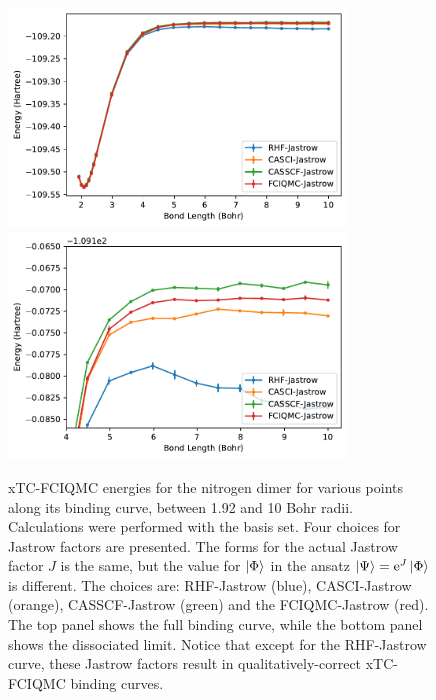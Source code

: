 \begin{figure}[htbp]
    \centering
    \includegraphics[width=0.8\textwidth]{figures/binding/all_binding_curves}
    \includegraphics[width=0.8\textwidth]{figures/binding/all_binding_curves_dissociated}
    \caption{xTC-FCIQMC energies for the nitrogen dimer for various points along its binding curve, between 1.92 and 10 Bohr radii. Calculations were performed with the \avtz basis set. Four choices for Jastrow factors are presented. The forms for the actual Jastrow factor $J$ is the same, but the value for $\ket{\Phi}$ in the ansatz $\ket\Psi=\mathrm{e}^J\ket\Phi$ is different. The choices are: RHF-Jastrow (blue), CASCI-Jastrow (orange), CASSCF-Jastrow (green) and the FCIQMC-Jastrow (red). The top panel shows the full binding curve, while the bottom panel shows the dissociated limit. Notice that except for the RHF-Jastrow curve, these Jastrow factors result in qualitatively-correct xTC-FCIQMC binding curves.
    }
    \label{fig:binding-curves-full-diss}
\end{figure}

